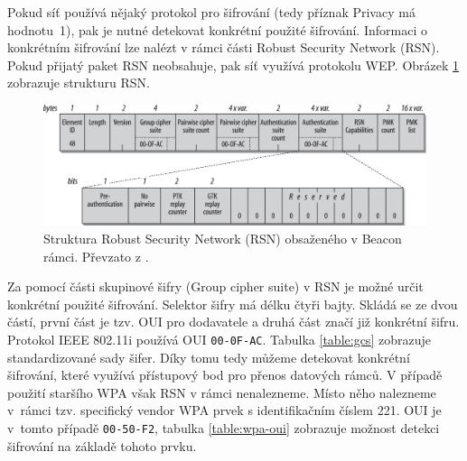Pokud síť používá nějaký protokol pro šifrování (tedy příznak Privacy má hodnotu~1), pak je nutné detekovat konkrétní použité šifrování. Informaci o konkrétním šifrování lze nalézt v rámci části Robust Security Network (RSN). Pokud přijatý paket RSN neobsahuje, pak síť využívá protokolu WEP. Obrázek \ref{img:rsn} zobrazuje strukturu RSN.
\begin{figure}[htbp]
  \centering
  \includegraphics[width=14cm]{obrazky-figures/rsn.png}
  \caption{Struktura Robust Security Network (RSN) obsaženého v Beacon rámci. Převzato z \cite{gast2017802}.}
  \label{img:rsn}
\end{figure}

Za pomocí části skupinové šifry (Group cipher suite) v RSN je možné určit konkrétní použité šifrování. Selektor šifry má délku čtyři bajty. Skládá se ze dvou částí, první část je tzv. OUI pro dodavatele a druhá část značí již konkrétní šifru. Protokol IEEE 802.11i používá OUI \texttt{00-0F-AC}. Tabulka \ref{table:gcs} zobrazuje standardizované sady šifer. Díky tomu tedy můžeme detekovat konkrétní šifrování, které využívá přístupový bod pro přenos datových rámců. V případě použití staršího WPA však RSN v rámci nenalezneme. Místo něho nalezneme v~rámci tzv. specifický vendor WPA prvek s identifikačním číslem 221. OUI je v~tomto případě \texttt{00-50-F2}, tabulka \ref{table:wpa-oui} zobrazuje možnost detekci šifrování na základě tohoto prvku.

